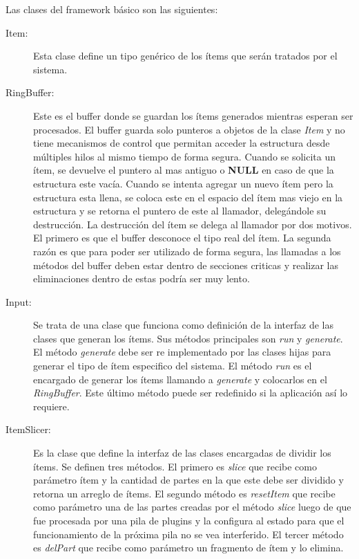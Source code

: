 Las clases del framework básico son las siguientes:

\begin{description}

	\item[Item:] Esta clase define un tipo genérico de los ítems que serán
		tratados por el sistema.

	\item[RingBuffer:] Este es el buffer donde se guardan los ítems
		generados mientras esperan ser procesados. El buffer guarda solo
		punteros a objetos de la clase \emph{Item} y no tiene mecanismos
		de control que permitan acceder la estructura desde múltiples
		hilos al mismo tiempo de forma segura. Cuando se solicita un
		ítem, se devuelve el puntero al mas antiguo o \textbf{NULL} en
		caso de que la estructura este vacía. Cuando se intenta agregar
		un nuevo ítem pero la estructura esta llena, se coloca este en
		el espacio del ítem mas viejo en la estructura y se retorna el
		puntero de este al llamador, delegándole su destrucción. La
		destrucción del ítem se delega al llamador por dos motivos. El
		primero es que el buffer desconoce el tipo real del ítem. La
		segunda razón es que para poder ser utilizado de forma segura,
		las llamadas a los métodos del buffer deben estar dentro de
		secciones criticas y realizar las eliminaciones dentro de estas
		podría ser muy lento.

	\item[Input:] Se trata de una clase que funciona como definición de la
		interfaz de las clases que generan los ítems. Sus métodos
		principales son \emph{run} y \emph{generate}. El método
		\emph{generate} debe ser re implementado por las clases hijas
		para generar el tipo de ítem especifico del sistema. El método
		\emph{run} es el encargado de generar los ítems llamando a
		\emph{generate} y colocarlos en el \emph{RingBuffer}. Este
		último método puede ser redefinido si la aplicación así lo
		requiere.

	\item[ItemSlicer:] Es la clase que define la interfaz de las clases
		encargadas de dividir los ítems. Se definen tres métodos. El
		primero es \emph{slice} que recibe como parámetro ítem y la
		cantidad de partes en la que este debe ser dividido y retorna un
		arreglo de ítems. El segundo método es \emph{resetItem} que
		recibe como parámetro una de las partes creadas por el método
		\emph{slice} luego de que fue procesada por una pila de plugins
		y la configura al estado para que el funcionamiento de la
		próxima pila no se vea interferido. El tercer método es
		\emph{delPart} que recibe como parámetro un fragmento de ítem y
		lo elimina.


\end{description}
